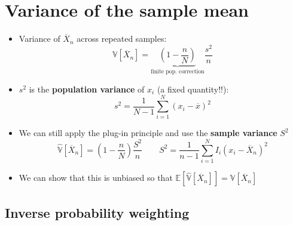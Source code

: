 \documentclass[
  letterpaper,
  DIV=11,
  numbers=noendperiod]{scrreprt}
\newcommand{\E}{\mathbb{E}}
\newcommand{\V}{\mathbb{V}}
\newcommand{\Xbar}{\overline{X}}
\theoremstyle{definition}
\theoremstyle{plain}
\theoremstyle{definition}
\theoremstyle{remark}
\begin{document}
\hypertarget{variance-of-the-sample-mean}{%
\section{Variance of the sample
mean}\label{variance-of-the-sample-mean}}

\begin{itemize}
\item
  Variance of \(\Xbar_n\) across repeated samples: \[ 
  \V[\Xbar_{n}] = \underbrace{\left(1 - \frac{n}{N}\right)}_{\text{finite pop. correction}} \frac{s^{2}}{n}
  \]
\item
  \(s^{2}\) is the \textbf{population variance} of \(x_i\) (a fixed
  quantity!!): \[ 
  s^{2}= \frac{1}{N-1} \sum_{i=1}^{N} (x_{i} - \overline{x})^{2} 
  \]
\item
  We can still apply the plug-in principle and use the \textbf{sample
  variance} \(S^2\) \[ 
  \widehat{\V}[\Xbar_{n}] = \left(1 - \frac{n}{N}\right)\frac{S^{2}}{n} \quad\quad S^{2} = \frac{1}{n-1}\sum_{i=1}^{N} I_{i}(x_{i} - \Xbar_{n})^{2}
  \]
\item
  We can show that this is unbiased so that
  \(\E[\widehat{\V}[\Xbar_{n}]] = \V[\Xbar_{n}]\)
\end{itemize}

\hypertarget{inverse-probability-weighting}{%
\subsection{Inverse probability
weighting}\label{inverse-probability-weighting}}
\end{document}
